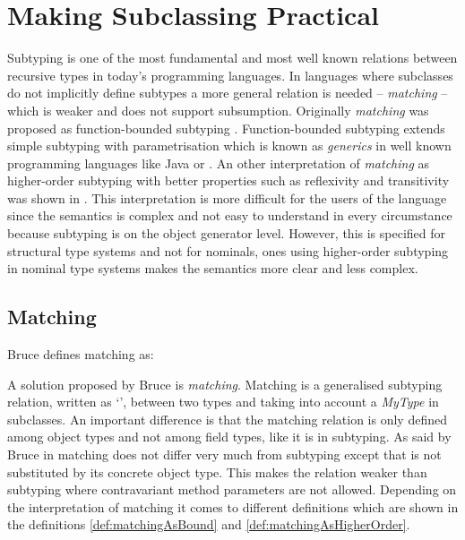 \section{Making Subclassing Practical}
\label{ctr:makingSubclassingPractical}
Subtyping is one of the most fundamental and most well known relations
between recursive types in today's programming languages. In languages
where subclasses do not implicitly define subtypes a more general
relation is needed -- \emph{matching} -- which is weaker and does
not support subsumption. Originally \emph{matching} was proposed as
function-bounded subtyping \cite{canning_f-bounded_1989}. Function-bounded
subtyping extends simple subtyping with parametrisation which is
known as \emph{generics} in well known programming languages
like Java or \cs \cite{barron-estrada_inheritance_2003}. An other
interpretation of \emph{matching} as higher-order subtyping with
better properties such as reflexivity and transitivity was shown in
\cite{abadi_subtyping_1996}. This interpretation is more
difficult for the users of the language since the semantics is complex
and not easy to understand in every circumstance because subtyping is
on the object generator level. However, this is specified for structural
type systems and not for nominals, ones using higher-order subtyping
in nominal type systems makes the semantics more clear and less complex.

\subsection{Matching}
\label{subsec:matching}
\begin{prop}[Matching]
	\label{prop:matching}
	Bruce defines matching as:
\end{prop}

A solution proposed by Bruce \cite{bruce_binary_1995} is
\emph{matching}. Matching is a generalised subtyping relation, written
as `\match', between two types and taking into account a \emph{MyType} in
subclasses. An important difference is that the matching relation is only
defined among object types and not among field types, like it is in subtyping. As
said by Bruce in \cite{bruce_foundations_2002} matching does not differ
very much from subtyping except that \mytype is not substituted by its
concrete object type. This makes the relation weaker than subtyping
where contravariant method parameters are not allowed. Depending
on the interpretation of matching it comes to different
definitions which are shown in the definitions
\ref{def:matchingAsBound} and \ref{def:matchingAsHigherOrder}.

